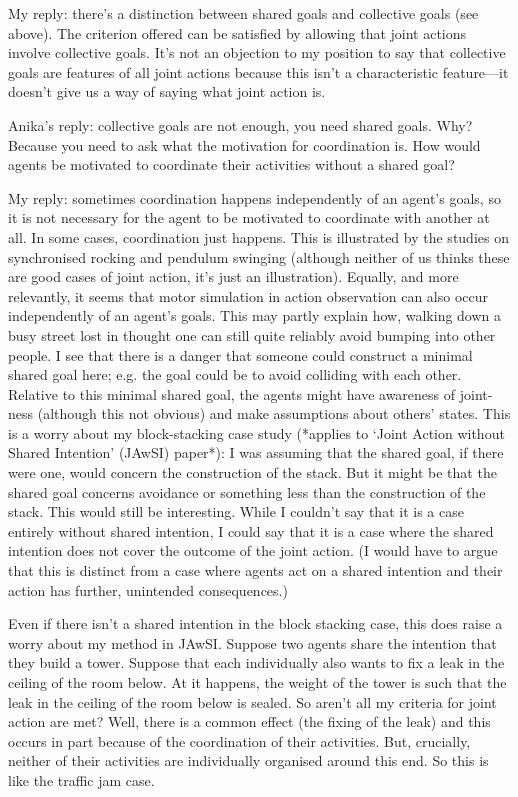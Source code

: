 \documentclass[12pt,a4paper]{extarticle}
\begin{document}
My reply: there's a distinction between shared goals and collective goals (see above).  The criterion offered can be satisfied by allowing that joint actions involve collective goals.  It's not an objection to my position to say that collective goals are features of all joint actions because this isn't a characteristic feature---it doesn't give us a way of saying what joint action is.

Anika's reply: collective goals are not enough, you need shared goals.  Why?  Because you need to ask what the motivation for coordination is.  How would agents be motivated to coordinate their activities without a shared goal?

My reply: sometimes coordination happens independently of an agent's goals, so it is not necessary for the agent to be motivated to coordinate with another at all.  In some cases, coordination just happens.  This is illustrated by the studies on synchronised rocking and pendulum swinging (although neither of us thinks these are good cases of joint action, it's just an illustration).  Equally, and more relevantly, it seems that motor simulation in action observation can also occur independently of an agent's goals.  This may partly explain how, walking down a busy street lost in thought one can still quite reliably avoid bumping into other people.  I see that there is a danger that someone could construct a minimal shared goal here; e.g. the goal could be to avoid colliding with each other.  Relative to this minimal shared goal, the agents might have awareness of joint-ness (although this not obvious) and make assumptions about others' states.  This is a worry about my block-stacking case study (*applies to `Joint Action without Shared Intention' (JAwSI) paper*): I was assuming that the shared goal, if there were one, would concern the construction of the stack.  But it might be that the shared goal concerns avoidance or something less than the construction of the stack.  This would still be interesting.  While I couldn't say that it is a case entirely without shared intention, I could say that it is a case where the shared intention does not cover the outcome of the joint action.  (I would have to argue that this is distinct from a case where agents act on a shared intention and their action has further, unintended consequences.)

Even if there isn't a shared intention in the block stacking case, this does raise a worry about my method in JAwSI.  Suppose two agents share the intention that they build a tower.  Suppose that each individually also wants to fix a leak in the ceiling of the room below.  At it happens, the weight of the tower is such that the leak in the ceiling of the room below is sealed.  So aren't all my criteria for joint action are met?  Well, there is a common effect (the fixing of the leak) and this occurs in part because of the coordination of their activities.  But, crucially, neither of their activities are individually organised around this end.  So this is like the traffic jam case.
\end{document}

